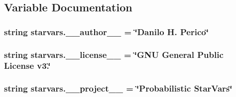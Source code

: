 \subsection{Variable Documentation}
\hypertarget{namespacestarvars_ac644d7f280f95cccc18a5d57a812e131}{
\subsubsection[{\-\_\-\-\_\-author\-\_\-\-\_\-}]{\setlength{\rightskip}{0pt plus 5cm}string starvars.\-\_\-\-\_\-author\-\_\-\-\_\- = \char`\"{}Danilo H. Perico\char`\"{}}}\label{namespacestarvars_ac644d7f280f95cccc18a5d57a812e131}
\hypertarget{namespacestarvars_a1264921cafa3bfaea6a08a307416bbc6}{
\subsubsection[{\-\_\-\-\_\-license\-\_\-\-\_\-}]{\setlength{\rightskip}{0pt plus 5cm}string starvars.\-\_\-\-\_\-license\-\_\-\-\_\- = \char`\"{}G\-N\-U General Public License v3.\char`\"{}}}\label{namespacestarvars_a1264921cafa3bfaea6a08a307416bbc6}
\hypertarget{namespacestarvars_afabb4c7baf270d344e2640778b38e5ff}{
\subsubsection[{\-\_\-\-\_\-project\-\_\-\-\_\-}]{\setlength{\rightskip}{0pt plus 5cm}string starvars.\-\_\-\-\_\-project\-\_\-\-\_\- = \char`\"{}Probabilistic {\bf Star\-Vars}\char`\"{}}}\label{namespacestarvars_afabb4c7baf270d344e2640778b38e5ff}
